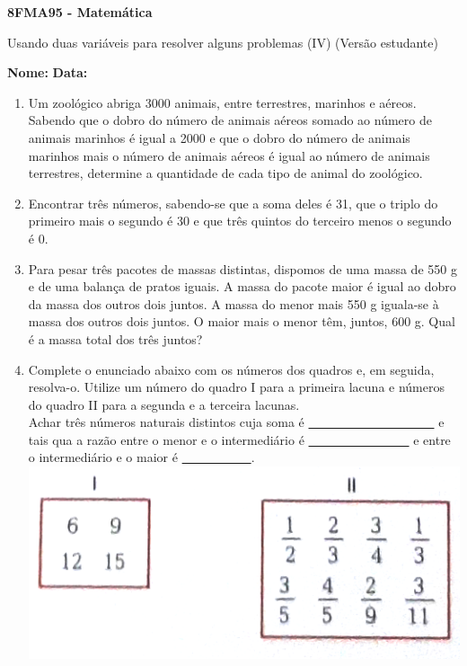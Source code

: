 \documentclass[a4paper,14pt]{article}
\begin{document}
	
	\noindent\textbf{8FMA95 - Matemática} 
	
	\begin{center}Usando duas variáveis para resolver alguns problemas (IV) (Versão estudante)
	\end{center}
	
	\noindent\textbf{Nome:} \underline{\hspace{10cm}}
	\noindent\textbf{Data:} \underline{\hspace{4cm}}
	
    \begin{multicols}{2}
    	\begin{enumerate}
			\item Um zoológico abriga 3000 animais, entre terrestres, marinhos e aéreos. Sabendo que o dobro do número de animais aéreos somado ao número de animais marinhos é igual a 2000 e que o dobro do número de animais marinhos mais o número de animais aéreos é igual ao número de animais terrestres, determine a quantidade de cada tipo de animal do zoológico. \columnbreak
			\item Encontrar três números, sabendo-se que a soma deles é 31, que o triplo do primeiro mais o segundo é 30 e que três quintos do terceiro menos o segundo é 0. \newpage
			\item Para pesar três pacotes de massas distintas, dispomos de uma massa de 550 g e de uma balança de pratos iguais. A massa do pacote maior é igual ao dobro da massa dos outros dois juntos. A massa do menor mais 550 g iguala-se à massa dos outros dois juntos. O maior mais o menor têm, juntos, 600 g. Qual é a massa total dos três juntos? \columnbreak
			\item Complete o enunciado abaixo com os números dos quadros e, em seguida, resolva-o. Utilize um número do quadro I para a primeira lacuna e números do quadro II para a segunda e a terceira lacunas. \\
			Achar três números naturais distintos cuja soma é \underline{~~~~~~~~~~~~~~~~~~~~} e tais qua a razão entre o menor e o intermediário é \underline{~~~~~~~~~~~~~~~~} e entre o intermediário e o maior é \underline{~~~~~~~~~~~}.
			\includegraphics[width=1\linewidth]{imagens_8FMA95/imagem1}
			

\end{enumerate}
\end{multicols}
\end{document}
